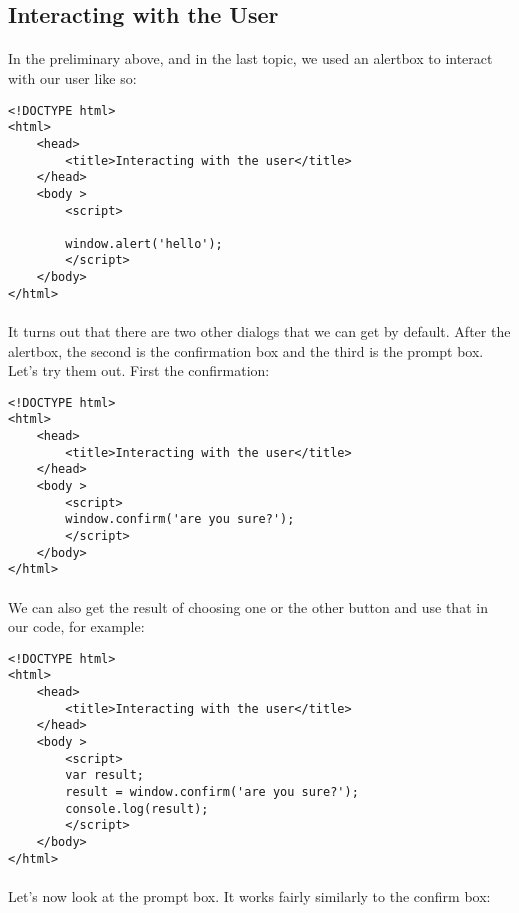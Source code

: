 \documentclass[10pt, a4paper]{article}
\begin{document}
\subsection{Interacting with the User}

\paragraph{} In the preliminary above, and in the last topic, we used an alertbox to interact with our user like so:

\begin{lstlisting}
<!DOCTYPE html>
<html>
    <head>
        <title>Interacting with the user</title>
    </head>
    <body >
        <script>
            
        window.alert('hello');    
        </script>
    </body>
</html>
\end{lstlisting}



\paragraph{} It turns out that there are two other dialogs that we can get by default. After the alertbox, the second is the confirmation box and the third is the prompt box. Let's try them out. First the confirmation:


\begin{lstlisting}
<!DOCTYPE html>
<html>
    <head>
        <title>Interacting with the user</title>
    </head>
    <body >
        <script>
        window.confirm('are you sure?');   
        </script>
    </body>
</html>
\end{lstlisting}

\paragraph{} We can also get the result of choosing one or the other button and use that in our code, for example:

\begin{lstlisting}
<!DOCTYPE html>
<html>
    <head>
        <title>Interacting with the user</title>
    </head>
    <body >
        <script>
        var result;
        result = window.confirm('are you sure?');
        console.log(result);    
        </script>
    </body>
</html>
\end{lstlisting}

\paragraph{} Let's now look at the prompt box. It works fairly similarly to the confirm box:
\end{document}
